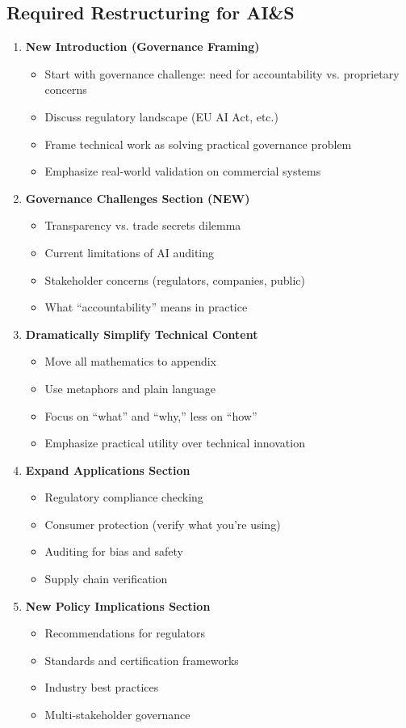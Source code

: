 \documentclass[12pt]{article}
\begin{document}
\subsection{Required Restructuring for AI\&S}

\begin{enumerate}[leftmargin=*]
\item \textbf{New Introduction (Governance Framing)}
\begin{itemize}
\item Start with governance challenge: need for accountability vs. proprietary concerns
\item Discuss regulatory landscape (EU AI Act, etc.)
\item Frame technical work as solving practical governance problem
\item Emphasize real-world validation on commercial systems
\end{itemize}

\item \textbf{Governance Challenges Section (NEW)}
\begin{itemize}
\item Transparency vs. trade secrets dilemma
\item Current limitations of AI auditing
\item Stakeholder concerns (regulators, companies, public)
\item What ``accountability'' means in practice
\end{itemize}

\item \textbf{Dramatically Simplify Technical Content}
\begin{itemize}
\item Move all mathematics to appendix
\item Use metaphors and plain language
\item Focus on ``what'' and ``why,'' less on ``how''
\item Emphasize practical utility over technical innovation
\end{itemize}

\item \textbf{Expand Applications Section}
\begin{itemize}
\item Regulatory compliance checking
\item Consumer protection (verify what you're using)
\item Auditing for bias and safety
\item Supply chain verification
\end{itemize}

\item \textbf{New Policy Implications Section}
\begin{itemize}
\item Recommendations for regulators
\item Standards and certification frameworks
\item Industry best practices
\item Multi-stakeholder governance
\end{itemize}
\end{enumerate}
\end{document}

